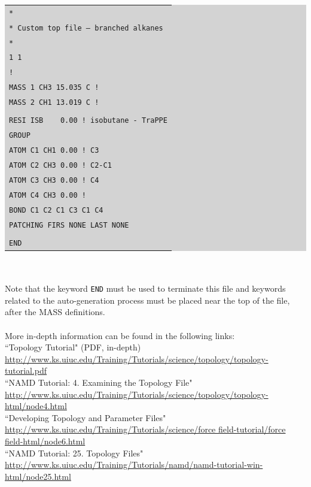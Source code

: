 \colorbox{lightgray}{
\begin{tabular}{l}
\texttt{*}\\
\texttt{* Custom top file -- branched alkanes}\\
\texttt{*}\\
\texttt{1  1}\\
\texttt{!}\\
\texttt{MASS   1  CH3  15.035 C !}\\
\texttt{MASS   2  CH1  13.019 C !}\\\\
\texttt{RESI ISB ~~ 0.00 ! isobutane - TraPPE}\\
\texttt{GROUP}\\
\texttt{ATOM C1 CH1    0.00 !    C3}\\
\texttt{ATOM C2 CH3    0.00 ! C2-C1}\\
\texttt{ATOM C3 CH3    0.00 !    C4}\\
\texttt{ATOM C4 CH3    0.00 !}\\
\texttt{BOND C1 C2 C1 C3 C1 C4}\\
\texttt{PATCHING FIRS NONE LAST NONE}\\\\
\texttt{END}
\end{tabular}}\\\\
Note that the keyword \texttt{END} must be used to terminate this file and keywords related to the auto-generation process must be placed near the top of the file, after the MASS definitions.\\\\
More in-depth information can be found in the following links:\\
``Topology Tutorial" (PDF, in-depth)\\
\url{http://www.ks.uiuc.edu/Training/Tutorials/science/topology/topology-tutorial.pdf}\\
``NAMD Tutorial: 4. Examining the Topology File"\\
\url{http://www.ks.uiuc.edu/Training/Tutorials/science/topology/topology-html/node4.html}\\
``Developing Topology and Parameter Files"\\
\url{http://www.ks.uiuc.edu/Training/Tutorials/science/force field-tutorial/force field-html/node6.html}\\
``NAMD Tutorial: 25. Topology Files"\\
\url{http://www.ks.uiuc.edu/Training/Tutorials/namd/namd-tutorial-win-html/node25.html}

